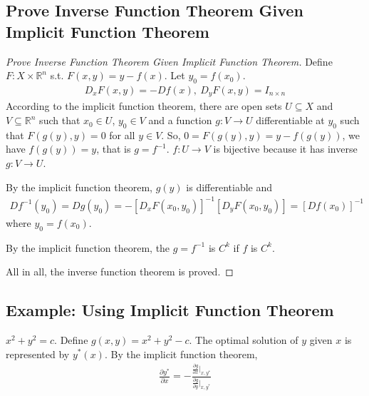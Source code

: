 \documentclass[11pt]{elegantbook}
\begin{document}
\subsection{Prove Inverse Function Theorem Given Implicit Function Theorem}
\begin{proof}[Prove Inverse Function Theorem Given Implicit Function Theorem]
    Define $F:X\times \mathbb{R}^n$ s.t. $F(x,y)=y-f(x)$. Let $y_0=f(x_0)$.
    \begin{equation}
        \begin{aligned}
            D_x F(x,y)=-Df(x),\ D_y F(x,y)=I_{n\times n}
        \end{aligned}
        \nonumber
    \end{equation}
    According to the implicit function theorem, there are open sets $U \subseteq X$ and $V \subseteq \mathbb{R}^n$ such that $x_0 \in U$, $y_0 \in V$ and a function $g : V \rightarrow U$ differentiable at $y_0$ such that $F(g(y), y) = 0$ for all $y \in V$. So, $0=F(g(y),y)=y-f(g(y))$, we have $f(g(y))=y$, that is $g=f^{-1}$.
    $f: U \rightarrow V$ is bijective because it has inverse $g : V \rightarrow U$.

    By the implicit function theorem, $g(y)$ is differentiable and
    \begin{equation}
        \begin{aligned}
            Df^{-1}(y_0)=Dg(y_0)=-[D_x F(x_0,y_0)]^{-1}[D_y F(x_0,y_0)]=[Df(x_0)]^{-1}
        \end{aligned}
        \nonumber
    \end{equation}
    where $y_0=f(x_0)$.
    
    By the implicit function theorem, the $g=f^{-1}$ is $C^k$ if $f$ is $C^k$.

    All in all, the inverse function theorem is proved.
\end{proof}

\subsection{Example: Using Implicit Function Theorem}


$x^2+y^2=c$. Define $g(x,y)=x^2+y^2-c$. The optimal solution of $y$ given $x$ is represented by $y^*(x)$. By the implicit function theorem,
\begin{equation}
    \begin{aligned}
        \frac{\partial y^*}{\partial x}=-\frac{\frac{\partial g}{\partial x}\big|_{x,y^*}}{\frac{\partial g}{\partial y}\big|_{x,y^*}}
    \end{aligned}
    \nonumber
\end{equation}
\end{document}
